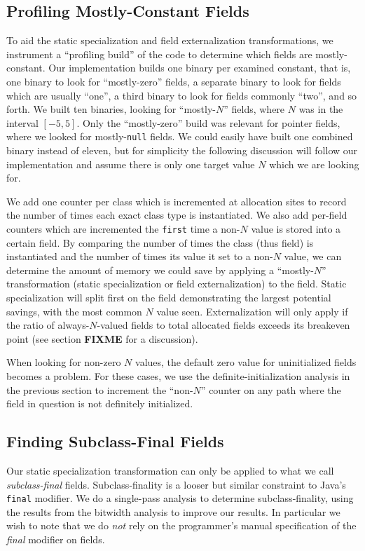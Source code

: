 \documentclass{acmconf}
\begin{document}
\subsection{Profiling Mostly-Constant Fields}
To aid the static specialization and field externalization
transformations, we instrument a ``profiling build'' of the code
to determine which fields are mostly-constant.  Our implementation
builds one binary per examined constant, that is, one binary to look
for ``mostly-zero'' fields, a separate binary to look for fields which
are usually ``one'', a third binary to look for fields commonly
``two'', and so forth.  We built ten binaries, looking for
``mostly-$N$'' fields, where $N$ was in the interval $[-5,5]$.
Only the ``mostly-zero'' build was relevant for pointer fields, where
we looked for mostly-{\tt null} fields.  We could easily have built
one combined binary instead of eleven, but for simplicity the following
discussion will follow our implementation and assume there is only one
target value $N$ which we are looking for.

We add one counter per class which is incremented at allocation sites
to record the number of times each exact class type is instantiated.
We also add per-field counters which are incremented the {\tt first}
time a non-$N$ value is stored into a certain field.  By comparing the
number of times the class (thus field) is instantiated and the number
of times its value it set to a non-$N$ value, we can determine the
amount of memory we could save by applying a ``mostly-$N$''
transformation (static specialization or field externalization) to the
field.  Static specialization will split first on the field
demonstrating the largest potential savings, with the most common $N$
value seen.  Externalization will only apply if the ratio of
always-$N$-valued fields to total allocated fields exceeds its
breakeven point (see section {\bf\Large FIXME} for a discussion).

When looking for non-zero $N$ values, the default zero value for
uninitialized fields becomes a problem.  For these cases, we use the
definite-initialization analysis in the previous section to increment the
``non-$N$'' counter on any path where the field in question is not
definitely initialized.

\subsection{Finding Subclass-Final Fields}

Our static specialization transformation can only be applied to what
we call {\it subclass-final} fields.  Subclass-finality is a looser
but similar constraint to Java's {\tt final} modifier.  We do a
single-pass analysis to determine subclass-finality, using the results
from the bitwidth analysis to improve our results.  In particular we
wish to note that we do {\it not} rely on the programmer's manual
specification of the {\it final} modifier on fields.
\end{document}
